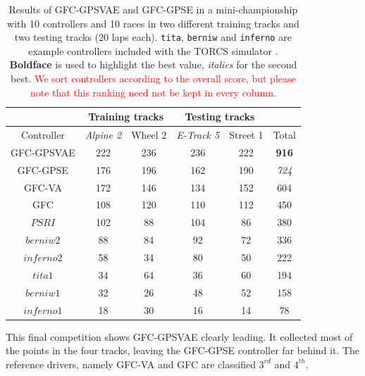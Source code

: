 \documentclass[10pt,journal,compsoc]{IEEEtran}
\begin{document}
\begin{table}[ht]
  \centering
  {\scriptsize
    \caption{ Results of {\sf GFC-GPSVAE} and {\sf GFC-GPSE}
      in a mini-championship with 10 controllers
      and 10 races in two different training tracks and two testing tracks (20 laps each). {\tt tita}, {\tt berniw} and {\tt inferno} are example controllers included with the TORCS
      simulator \cite{torcs4}.  {\bf Boldface} is used to highlight
      the best value, {\em italics} for the second
      best. \textcolor{red}{We sort controllers according to the
        overall score, but please note that this ranking need not be
        kept in every column.}}
    {
            \begin{tabular}{|c|c|c|c|c||c|}
	\hline
	& \multicolumn{2}{|c|}{Training tracks} &\multicolumn{2}{|c|}{Testing tracks} \\
	\hline
	Controller&\textit{Alpine 2} &Wheel 2&\textit{E-Track 5}  &Street 1&Total\\
        \hline
        \hline



{\sf GFC-GPSVAE}	&222&236&236&222&	{\bf 916}\\
{\sf GFC-GPSE}	&176&196&162&190&{\em 724}\\

{\sf GFC-VA} \cite{DBLP:conf/cig/SalemMG19}&172&146&	134&152& 604\\
{\sf GFC}  \cite{salem_cig2018}	&108&	120&110&	112&	450\\
$PSRI$\cite{PerezEvolvingFuzzy09}&102&88 &104&86 &380\\
$berniw2$		&88	&84 &92 &72 &336\\
$inferno2$	&58	&34 &80 &50 &222\\
$tita1$		&34 &64 &36 &60 &194\\
$berniw1$		&32	&26 &48 &52 &158\\
$inferno1$	&18	&30 &16 &14 &78\\
\hline

\end{tabular}
}\label{tab:allsresults}
}
\end{table}




This final competition shows {\sf GFC-GPSVAE} clearly leading. It
collected most of the points in the four tracks, leaving the {\sf
  GFC-GPSE} controller far behind it. The reference drivers, namely
{\sf GFC-VA} and {\sf GFC}  are classified $3^{rd}$ and $4^{th}$.
\end{document}

